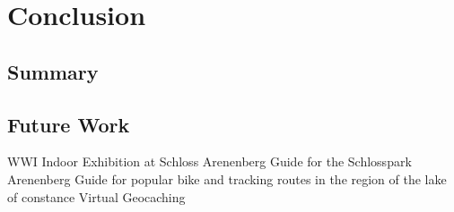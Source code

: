
\chapter{Conclusion} %

\label{conclusion} %



\section{Summary}


\section{Future Work}

WWI Indoor Exhibition at Schloss Arenenberg
Guide for the Schlosspark Arenenberg
Guide for popular bike and tracking routes in the region of the lake of constance
Virtual Geocaching